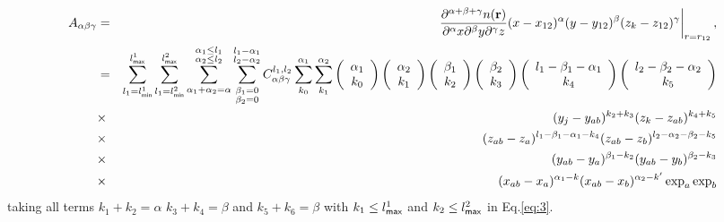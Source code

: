 \documentclass[prb]{revtex4}
\begin{document}
\begin{eqnarray}
  \label{eq:8}
  A_{\alpha\beta\gamma} &=&\left.\frac{\partial^{\alpha+\beta+\gamma} n({\bf
      r})}{\partial^\alpha x \partial ^ \beta y \partial ^ \gamma z} (x - x_{12})^\alpha (y - y_{12})^\beta (z_k -z_{12})^\gamma\right|_{r=r_{12}},\\
  &=&  \sum_{l_1 = l_{\sf min}^1}^{l_{\sf max}^1} \sum_{l_1 = l_{\sf min}^2}^{l_{\sf max}^2} \sum_{\alpha_1 + \alpha_2 = \alpha}^{\substack{\alpha_1 \leq l_1\\ \alpha_2 \leq l_2}} \sum_{\substack{\beta_1 = 0\\\beta_2 = 0}} ^{\substack{l_1 - \alpha_1\\l_2 - \alpha_2}}  C^{l_1,l_2}_{\alpha\beta\gamma} \sum_{k_0} ^ {\alpha_1}\sum_{k_1} ^ {\alpha_2} \left(
            \begin{array}{c}
              {\alpha_1}\\
              k_0\end{array}
              \right)
              \left(
              \begin{array}{c}
                \alpha_2\\
                k_1
              \end{array}\right)
              \left(\begin{array}{c}
                \beta_1\\
                k_2\end{array}
                \right)
                \left(
                \begin{array}{c}
                  \beta_2\\
                  k_3
                \end{array}\right)
                \left(\begin{array}{c}
                  l_1 - \beta_1 - \alpha_1\\
                  k_4\end{array}
                  \right)
                  \left(
                  \begin{array}{c}
                    l_2 - \beta_2 - \alpha_2\\
                    k_5
                  \end{array}\right)\nonumber\\ &\times&
                  (y_j-y_{ab})^{k_2+k_3} (z_k - z_{ab}) ^ {k_4 + k_5}\nonumber\\ &\times& (z_{ab} - z_a) ^{l_1 - \beta_1 - \alpha_1 - k_4} (z_{ab} - z_b)^{l_2 - \alpha_2 - \beta_2-k_5}\nonumber  \\ &\times& (y_{ab} - y_a) ^{\beta_1 - k_2} (y_{ab} - y_b)^{\beta_2-k_3}\nonumber \\ &\times& (x_{ab}-x_a)^{\alpha_1 - k} (x_{ab}-x_b)^{\alpha_2 - k'} \exp_a\exp_b
\end{eqnarray}
taking all terms $k_1 + k_2 = \alpha$ $k_3 + k_4 = \beta$ and $k_5 + k_6 =
\beta$ with $k_1 \leq l^1_{\sf max}$ and $k_2 \leq l^2_{\sf max}$ in
Eq.\ref{eq:3}.
\end{document}
